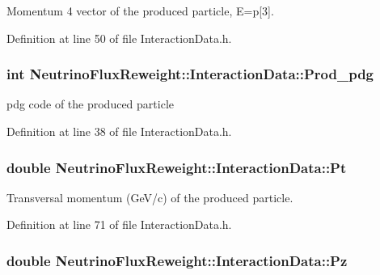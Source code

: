 Momentum 4 vector of the produced particle, E=p\mbox{[}3\mbox{]}. 



Definition at line 50 of file Interaction\-Data.\-h.

\hypertarget{class_neutrino_flux_reweight_1_1_interaction_data_aaf39f277663067e29fa997b208b09441}{
\subsubsection[{Prod\-\_\-pdg}]{\setlength{\rightskip}{0pt plus 5cm}int Neutrino\-Flux\-Reweight\-::\-Interaction\-Data\-::\-Prod\-\_\-pdg}}\label{class_neutrino_flux_reweight_1_1_interaction_data_aaf39f277663067e29fa997b208b09441}


pdg code of the produced particle 



Definition at line 38 of file Interaction\-Data.\-h.

\hypertarget{class_neutrino_flux_reweight_1_1_interaction_data_a769e8d7c2862f32c3526e4fce963ec79}{
\subsubsection[{Pt}]{\setlength{\rightskip}{0pt plus 5cm}double Neutrino\-Flux\-Reweight\-::\-Interaction\-Data\-::\-Pt}}\label{class_neutrino_flux_reweight_1_1_interaction_data_a769e8d7c2862f32c3526e4fce963ec79}


Transversal momentum (Ge\-V/c) of the produced particle. 



Definition at line 71 of file Interaction\-Data.\-h.

\hypertarget{class_neutrino_flux_reweight_1_1_interaction_data_a95a42582b8a1d910bc254cb74480b44f}{
\subsubsection[{Pz}]{\setlength{\rightskip}{0pt plus 5cm}double Neutrino\-Flux\-Reweight\-::\-Interaction\-Data\-::\-Pz}}\label{class_neutrino_flux_reweight_1_1_interaction_data_a95a42582b8a1d910bc254cb74480b44f}


